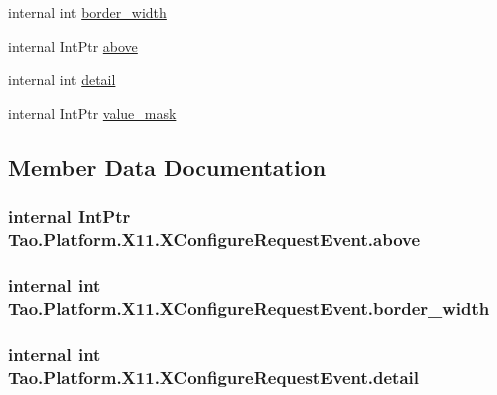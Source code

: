 \begin{DoxyCompactItemize}
internal int \hyperlink{struct_tao_1_1_platform_1_1_x11_1_1_x_configure_request_event_a899b982db581f39e36bb93eab2ec38c5}{border\_\-width}
\item 
internal IntPtr \hyperlink{struct_tao_1_1_platform_1_1_x11_1_1_x_configure_request_event_a054bc9cfbebde408caac91b3e05230bc}{above}
\item 
internal int \hyperlink{struct_tao_1_1_platform_1_1_x11_1_1_x_configure_request_event_acecd2be59b7989070cacd716e6f1dd2f}{detail}
\item 
internal IntPtr \hyperlink{struct_tao_1_1_platform_1_1_x11_1_1_x_configure_request_event_aa479d0a49227c4e7955763ed7929ca90}{value\_\-mask}
\end{DoxyCompactItemize}


\subsection{Member Data Documentation}
\hypertarget{struct_tao_1_1_platform_1_1_x11_1_1_x_configure_request_event_a054bc9cfbebde408caac91b3e05230bc}{
\subsubsection[{above}]{\setlength{\rightskip}{0pt plus 5cm}internal IntPtr {\bf Tao.Platform.X11.XConfigureRequestEvent.above}}}
\label{struct_tao_1_1_platform_1_1_x11_1_1_x_configure_request_event_a054bc9cfbebde408caac91b3e05230bc}
\hypertarget{struct_tao_1_1_platform_1_1_x11_1_1_x_configure_request_event_a899b982db581f39e36bb93eab2ec38c5}{
\subsubsection[{border\_\-width}]{\setlength{\rightskip}{0pt plus 5cm}internal int {\bf Tao.Platform.X11.XConfigureRequestEvent.border\_\-width}}}
\label{struct_tao_1_1_platform_1_1_x11_1_1_x_configure_request_event_a899b982db581f39e36bb93eab2ec38c5}
\hypertarget{struct_tao_1_1_platform_1_1_x11_1_1_x_configure_request_event_acecd2be59b7989070cacd716e6f1dd2f}{
\subsubsection[{detail}]{\setlength{\rightskip}{0pt plus 5cm}internal int {\bf Tao.Platform.X11.XConfigureRequestEvent.detail}}}
